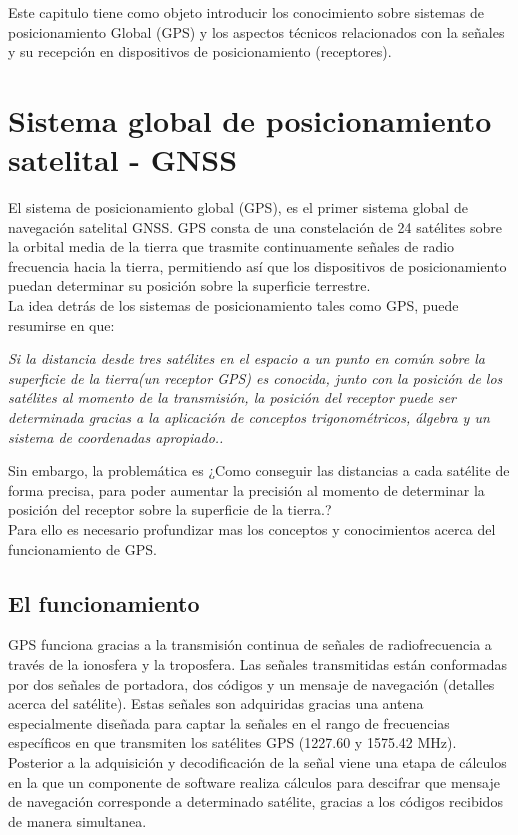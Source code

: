 Este capitulo tiene como objeto introducir los conocimiento sobre sistemas de posicionamiento Global (GPS) y los aspectos técnicos relacionados con la señales y su recepción en dispositivos de posicionamiento (receptores).

\section{Sistema global de posicionamiento satelital - GNSS}

El sistema de posicionamiento global (GPS), es el primer sistema global de navegación satelital GNSS. GPS consta de una constelación de 24 satélites sobre la orbital media de la tierra que trasmite continuamente señales de radio frecuencia hacia la tierra, permitiendo así que los dispositivos de posicionamiento puedan determinar su posición sobre la superficie terrestre.\\

La idea detrás de los sistemas de posicionamiento tales como GPS, puede resumirse en que:

\textit{Si la distancia desde tres satélites en el espacio a un punto en común sobre la superficie de la tierra(un receptor GPS) es conocida, junto con la posición de los satélites al momento de la transmisión, la posición del receptor puede ser determinada gracias a la aplicación de conceptos trigonométricos, álgebra y un sistema de coordenadas apropiado.\cite{Thompson_1998}.}

Sin embargo, la problemática es ¿Como conseguir las distancias a cada satélite de forma precisa, para poder aumentar la precisión al momento de determinar la posición del receptor sobre la superficie de la tierra.?\\

Para ello es necesario profundizar mas los conceptos y conocimientos acerca del funcionamiento de GPS.\\

\subsection{El funcionamiento}

GPS funciona gracias a la transmisión continua de señales de radiofrecuencia a través de la ionosfera y la troposfera. Las señales transmitidas están conformadas por dos señales de portadora, dos códigos y un mensaje de navegación (detalles acerca del satélite). Estas señales son adquiridas gracias una antena especialmente diseñada para captar la señales en el rango de frecuencias específicos en que transmiten los satélites GPS (1227.60 y 1575.42 MHz). Posterior a la adquisición y decodificación de la señal viene una etapa de cálculos en la que un componente de software realiza cálculos para descifrar que mensaje de navegación corresponde a determinado satélite, gracias a los códigos recibidos de manera simultanea.


